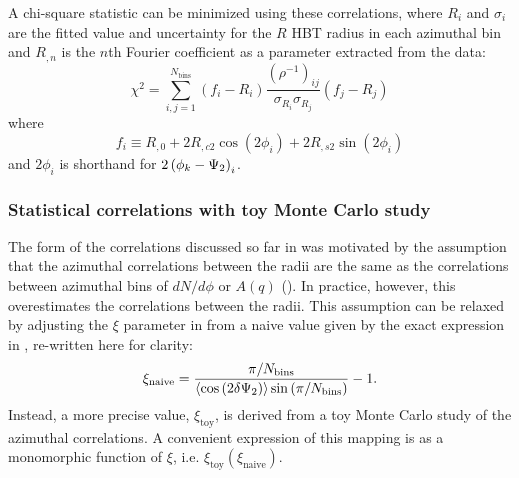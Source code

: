 A chi-square statistic can be minimized using these correlations, where $R_i$ and $\sigma_{i}$ are the fitted value and uncertainty for the $R$ HBT radius in each azimuthal bin and $R_{,n}$ is the $n$th Fourier coefficient as a parameter extracted from the data:
\begin{equation} \label{eq:chi_sq_mod}
\chi^2 = \sum_{i,j=1}^{N_\textrm{bins}} \left( f_i - R_i \right) \frac{(\rho^{-1})_{ij}}{\sigma_{R_i} \sigma_{R_j}} \left( f_j - R_j \right)
\end{equation}
where
\[f_i \equiv R_{,0} + 2R_{,c2}\cos(2\phi_i) + 2R_{,s2}\sin(2\phi_i)\]
and $2\phi_i$ is shorthand for $2\left(\phi_{k}-\Psi_{2}\right)_i$.

\subsubsection{Statistical correlations with toy Monte Carlo study}

The form of the correlations discussed so far in \Sect{\ref{subsec:azi_correlations}} was motivated by the assumption that the azimuthal correlations between the radii are the same as the correlations between azimuthal bins of $dN/d\phi$ or $A(q)$ (\Eqn{\ref{eq:azi_corr}}).
In practice, however, this overestimates the correlations between the radii.
This assumption can be relaxed by adjusting the $\xi$ parameter in \Eqnrange{\ref{eq:azi_corr}}{\ref{eq:corr_coeff_matrix_inv}} from a naive value given by the exact expression in \Eqn{\ref{eq:xi_def}}, re-written here for clarity:
\[ \xi_\textrm{naive} = \frac{\pi/N_\textrm{bins}}{\langle \cos\left(2\delta\Psi_{2}\right) \rangle \sin\left(\pi/N_\textrm{bins}\right)} - 1 .\]
Instead, a more precise value, $\xi_\textrm{toy}$, is derived from a toy Monte Carlo study of the azimuthal correlations.
A convenient expression of this mapping is as a monomorphic function of $\xi$, i.e. $\xi_\textrm{toy}(\xi_\textrm{naive})$.

